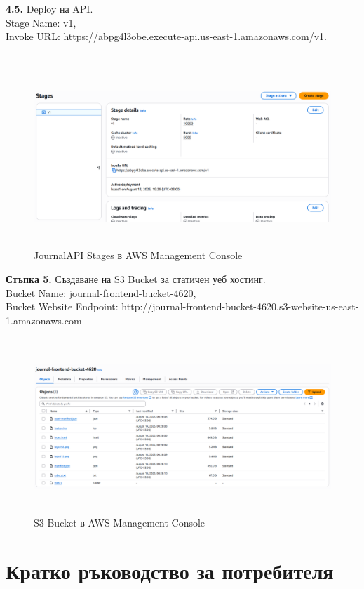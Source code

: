 \documentclass[12pt]{article}
\begin{document}
\noindent\textbf{4.5.} Deploy на API.\\
Stage Name: v1,\\
Invoke URL: https://abpg4l3obe.execute-api.us-east-1.amazonaws.com/v1.

 \begin{figure}[H]
\centering
    \includegraphics[scale=0.4]{stage.png}
  \caption{JournalAPI Stages в AWS Management Console}
\end{figure}

\medskip

\noindent\textbf{Стъпка 5.} Създаване на S3 Bucket за статичен уеб хостинг.\\
Bucket Name: journal-frontend-bucket-4620,\\
Bucket Website Endpoint: http://journal-frontend-bucket-4620.s3-website-us-east-1.amazonaws.com\\

 \begin{figure}[H]
\centering
    \includegraphics[scale=0.4]{s3.png}
  \caption{S3 Bucket в AWS Management Console}
\end{figure}

\medskip

\section{Кратко ръководство за потребителя}
\end{document}
